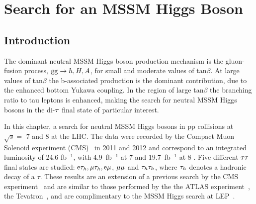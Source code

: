 \chapter{Search for an MSSM Higgs Boson}
\section{Introduction}

The dominant neutral MSSM Higgs boson production mechanism is the gluon-fusion process, 
$\mathrm{g}\mathrm{g} \to h, H, A$, for small and moderate values of tan$\beta$. At large values of tan$\beta$ 
the b-associated production is the dominant contribution, due to the enhanced bottom Yukawa 
coupling. In the region of large tan$\beta$ the branching ratio to tau leptons is enhanced, 
making the search for neutral MSSM Higgs bosons in the di-$\mathrm{\tau}$ final state of particular interest. 

In this chapter, a search for neutral MSSM Higgs bosons in pp collisions at $\sqrt{s}=$ 7 \TeV 
and 8 \TeV at the LHC. The data were recorded by the Compact Muon Solenoid experiment (CMS)~\cite{CMS-JINST} 
in 2011 and 2012 and correspond to an integrated luminosity of 24.6 fb$^{-1}$, with 4.9~fb$^{-1}$ 
at 7 \TeV and 19.7~fb$^{-1}$ at 8 \TeV. Five different $\mathrm{\tau}\mathrm{\tau}$ final states are studied: 
$\mathrm{e}\mathrm{\tau}_{h}, \mathrm{\mu}\mathrm{\tau}_{h}, \mathrm{e}\mathrm{\mu}$, $\mathrm{\mu}\mathrm{\mu}$ and $\mathrm{\tau}_{h}\mathrm{\tau}_{h}$, where $\mathrm{\tau}_{h}$ denotes a 
hadronic decay of a $\tau$. These results are an extension of a previous search by the CMS 
experiment~\cite{CMS-PAPER-HIG-10-002} and are similar to those performed by the the ATLAS 
experiment~\cite{Atlas-MSSM}, the Tevatron~\cite{Tevatron-MSSM, D0-MSSM, CDF-MSSM}, and are 
complimentary to the MSSM Higgs search at LEP~\cite{LEP2-MSSM}. 


